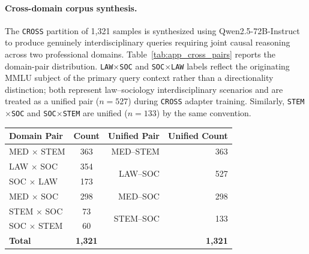 \documentclass[a4paper,fleql]{cas-sc}
\begin{document}
\paragraph{Cross-domain corpus synthesis.}
The \texttt{CROSS} partition of 1,321 samples is synthesized using
Qwen2.5-72B-Instruct to produce genuinely interdisciplinary queries
requiring joint causal reasoning across two professional domains.
Table~\ref{tab:app_cross_pairs} reports the domain-pair distribution.
\texttt{LAW$\times$SOC} and \texttt{SOC$\times$LAW} labels reflect the
originating MMLU subject of the primary query context rather than a
directionality distinction; both represent law--sociology interdisciplinary
scenarios and are treated as a unified pair ($n{=}527$) during
\texttt{CROSS} adapter training. Similarly, \texttt{STEM$\times$SOC} and
\texttt{SOC$\times$STEM} are unified ($n{=}133$) by the same convention.

\vspace{6pt}
\begin{center}
\begingroup
{}
\label{tab:app_cross_pairs}
\vspace{4pt}
\renewcommand{\arraystretch}{1.8}
\begin{tabular}{lcrr}
\toprule
\textbf{Domain Pair} & \textbf{Count} & \textbf{Unified Pair} & \textbf{Unified Count} \\
\midrule
MED $\times$ STEM  & 363 & MED--STEM & 363 \\
\midrule
LAW $\times$ SOC   & 354 & \multirow{2}{*}{LAW--SOC} & \multirow{2}{*}{527} \\
SOC $\times$ LAW   & 173 & & \\
\midrule
MED $\times$ SOC   & 298 & MED--SOC  & 298 \\
\midrule
STEM $\times$ SOC  &  73 & \multirow{2}{*}{STEM--SOC} & \multirow{2}{*}{133} \\
SOC $\times$ STEM  &  60 & & \\
\midrule
\textbf{Total} & \textbf{1,321} & & \textbf{1,321} \\
\bottomrule
\end{tabular}
\endgroup
\end{center}
\vspace{6pt}
\end{document}
